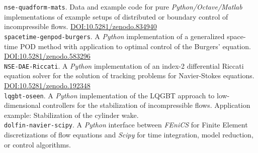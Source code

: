 \texttt{nse-quadform-mats}. Data and example code for pure \emph{Python/Octave/Matlab} implementations of example setups of distributed or boundary control of incompressible flows. \href{https://doi.org/10.5281/zenodo.834940}{DOI:10.5281/zenodo.834940} \\

\texttt{spacetime-genpod-burgers}. A \emph{Python} implementation of a generalized space-time POD method with application to optimal control of the Burgers' equation. \\ \href{http://doi.org/10.5281/zenodo.583296}{DOI:10.5281/zenodo.583296}\\

\texttt{NSE-DAE-Riccati}. A \emph{Python} implementation of an index-2 differential Riccati equation solver for the solution of tracking problems for Navier-Stokes equations. \\ \href{http://doi.org/10.5281/zenodo.192348}{DOI:10.5281/zenodo.192348}\\

\texttt{lqgbt-oseen}. A \emph{Python} implementation of the LQGBT approach to low-dimensional controllers for the stabilization of incompressible flows. Application example: Stabilization of the cylinder wake.\\

\texttt{dolfin-navier-scipy}. A \emph{Python} interface between \emph{FEniCS} for Finite Element discretizations of flow equations and \emph{Scipy} for time integration, model reduction, or control algorithms.

